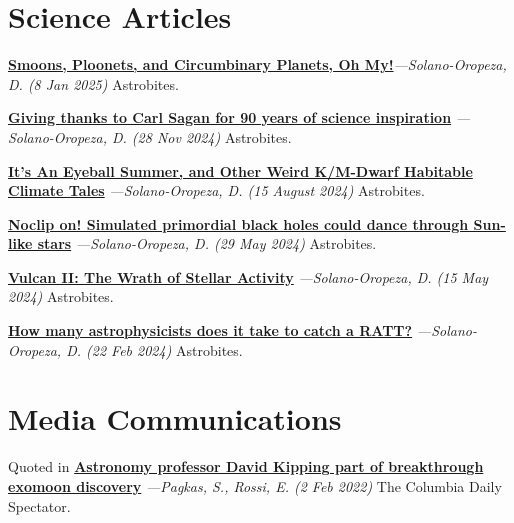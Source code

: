 \documentclass[a4paper,11pt]{article}
\begin{document}
\section{Science Articles}

    {\href{https://astrobites.org/2025/01/08/smoons-ploonets-and-circumbinary-planets-oh-my/}{\textbf{Smoons, Ploonets, and Circumbinary Planets, Oh My!}}}\textit{—Solano-Oropeza, D. (8 Jan 2025)} Astrobites.
    \vspace{1.5mm}

    {\href{https://astrobites.org/2024/11/28/giving-thanks-to-carl-sagan-for-90-years-of-science-inspiration/} {\textbf{Giving thanks to Carl Sagan for 90 years of science inspiration}}} \textit{—Solano-Oropeza, D. (28 Nov 2024)} Astrobites.
    \vspace{1.5mm}

    {\href{https://astrobites.org/2024/08/15/its-an-eyeball-summer-and-other-weird-k-m-dwarf-habitable-climate-tales/}{\textbf{It’s An Eyeball Summer, and Other Weird K/M-Dwarf Habitable Climate Tales}}} \textit{—Solano-Oropeza, D. (15 August 2024)} Astrobites.
    \vspace{1.5mm}


    {\href{https://astrobites.org/2024/05/29/noclip-on-simulated-primordial-black-holes-could-dance-through-sun-like-stars/}{\textbf{Noclip on! Simulated primordial black holes could dance through Sun-like stars}}} \textit{—Solano-Oropeza, D. (29 May 2024)} Astrobites.
    \vspace{1.5mm}

    {\href{https://astrobites.org/2024/02/22/how-many-astrophysicists-does-it-take-to-catch-a-ratt/}{\textbf{Vulcan II: The Wrath of Stellar Activity}}} \textit{—Solano-Oropeza, D. (15 May 2024)} Astrobites.
    \vspace{1.5mm}

    {\href{https://astrobites.org/2024/02/22/how-many-astrophysicists-does-it-take-to-catch-a-ratt/}{\textbf{How many astrophysicists does it take to catch a RATT?}}} \textit{—Solano-Oropeza, D. (22 Feb 2024)} Astrobites.
    \vspace{1.5mm}
    
\section{Media Communications}
    Quoted in {\href{https://www.columbiaspectator.com/news/2022/02/02/astronomy-professor-david-kipping-part-of-breakthrough-exomoon-discovery/}{\textbf{Astronomy professor David Kipping part of breakthrough exomoon discovery}}} \textit{—Pagkas, S., Rossi, E. (2 Feb 2022)} The Columbia Daily Spectator.
\end{document}
